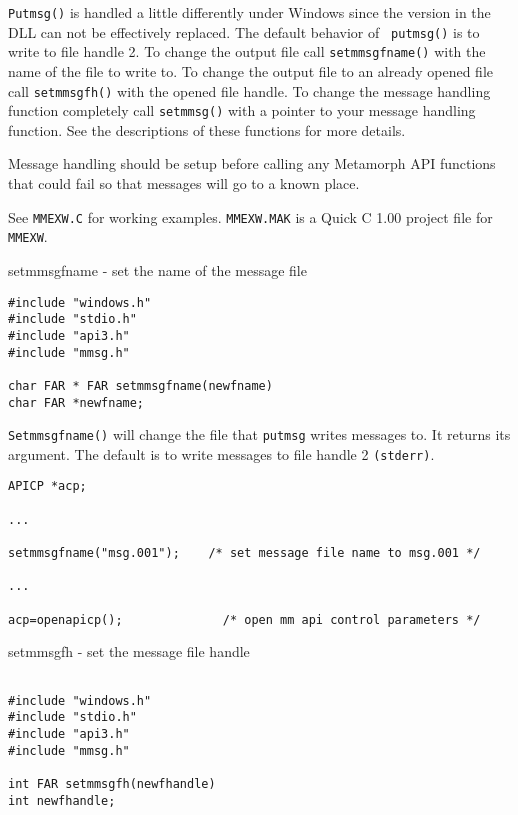 \verb`Putmsg()` is handled a little differently under Windows since the
version in the DLL can not be effectively replaced.  The default
behavior of \verb` putmsg()` is to write to file handle 2. To change the
output file call \verb`setmmsgfname()` with the name of the file to write
to.  To change the output file to an already opened file call
\verb`setmmsgfh()` with the opened file handle.  To change the message
handling function completely call \verb`setmmsg()` with a pointer to your
message handling function.  See the descriptions of these
functions for more details.

Message handling should be setup before calling any Metamorph API
functions that could fail so that messages will go to a known
place.

See \verb`MMEXW.C` for working examples.  \verb`MMEXW.MAK` is a Quick C 1.00
project file for \verb`MMEXW`.

\NAME
{setmmsgfname - set the name of the message file}

\SYNOPSIS
\begin{verbatim}
#include "windows.h"
#include "stdio.h"
#include "api3.h"
#include "mmsg.h"

char FAR * FAR setmmsgfname(newfname)
char FAR *newfname;

\end{verbatim}

\DESCRIPTION

\verb`Setmmsgfname()` will change the file that \verb`putmsg` writes messages
to.  It returns its argument.  The default is to write messages to
file handle 2 \verb`(stderr)`.

\EXAMPLE
\begin{verbatim}
APICP *acp;

...

setmmsgfname("msg.001");    /* set message file name to msg.001 */

...

acp=openapicp();              /* open mm api control parameters */

\end{verbatim}

\NAME
{setmmsgfh - set the message file handle}

\SYNOPSIS
\begin{verbatim}

#include "windows.h"
#include "stdio.h"
#include "api3.h"
#include "mmsg.h"

int FAR setmmsgfh(newfhandle)
int newfhandle;

\end{verbatim}

